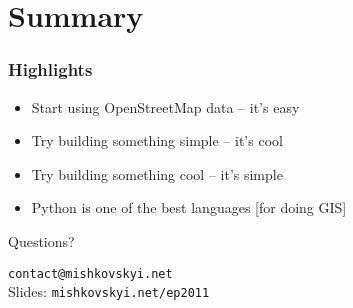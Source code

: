 \documentclass[14pt]{beamer}
\begin{document}
\section*{Summary}

\begin{frame}
  \begin{center}
  \end{center}
\end{frame}

\begin{frame}
  \frametitle{Highlights}
  \begin{itemize}
  \item Start using OpenStreetMap data -- it's easy
  \item Try building something simple -- it's cool
  \item Try building something cool -- it's simple
  \item Python is one of the best languages [for doing GIS]
  \end{itemize}
\end{frame}

\begin{frame}
  \begin{center}
    \LARGE{Questions?}
  \end{center}
  \vfill
  \begin{center}
    \texttt{contact@mishkovskyi.net}\\
    Slides: \texttt{mishkovskyi.net/ep2011}
  \end{center}
\end{frame}




















\end{document}
